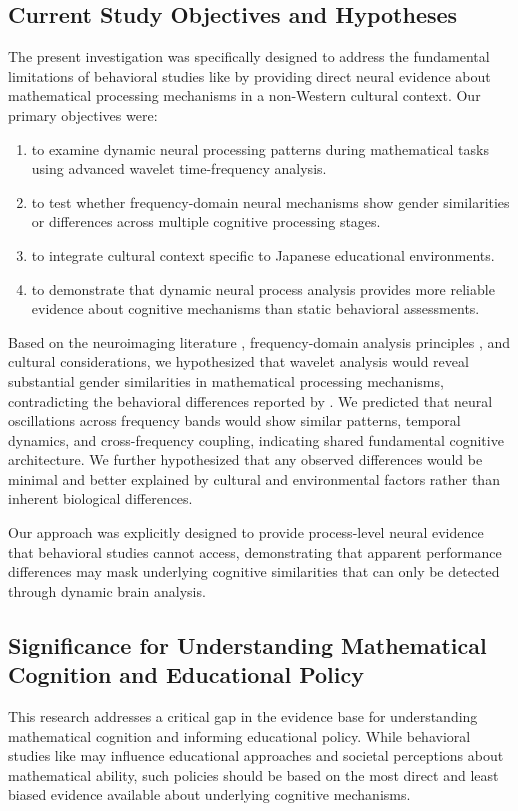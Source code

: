\documentclass[pdflatex,sn-nature]{sn-jnl}%
\theoremstyle{thmstyleone}%
\theoremstyle{thmstyletwo}%
\theoremstyle{thmstylethree}%
\begin{document}
\subsection{Current Study Objectives and Hypotheses}
The present investigation was specifically designed to address the fundamental limitations of behavioral studies like \cite{martinot2025mathematical} by providing direct neural evidence about mathematical processing mechanisms in a non-Western cultural context. Our primary objectives were: 
\begin{enumerate}
\item to examine dynamic neural processing patterns during mathematical tasks using advanced wavelet time-frequency analysis.
\item to test whether frequency-domain neural mechanisms show gender similarities or differences across multiple cognitive processing stages.
\item to integrate cultural context specific to Japanese educational environments.
\item to demonstrate that dynamic neural process analysis provides more reliable evidence about cognitive mechanisms than static behavioral assessments.
\end{enumerate}

Based on the neuroimaging literature \cite{dehaene2003three,ansari2019mathematical}, frequency-domain analysis principles \cite{buzsaki2006rhythms,fries2005mechanism}, and cultural considerations, we hypothesized that wavelet analysis would reveal substantial gender similarities in mathematical processing mechanisms, contradicting the behavioral differences reported by \cite{martinot2025mathematical}. We predicted that neural oscillations across frequency bands would show similar patterns, temporal dynamics, and cross-frequency coupling, indicating shared fundamental cognitive architecture. We further hypothesized that any observed differences would be minimal and better explained by cultural and environmental factors rather than inherent biological differences.

Our approach was explicitly designed to provide process-level neural evidence that behavioral studies cannot access, demonstrating that apparent performance differences may mask underlying cognitive similarities that can only be detected through dynamic brain analysis.


\subsection{Significance for Understanding Mathematical Cognition and Educational Policy}
This research addresses a critical gap in the evidence base for understanding mathematical cognition and informing educational policy. While behavioral studies like \cite{martinot2025mathematical} may influence educational approaches and societal perceptions about mathematical ability, such policies should be based on the most direct and least biased evidence available about underlying cognitive mechanisms.
\end{document}
